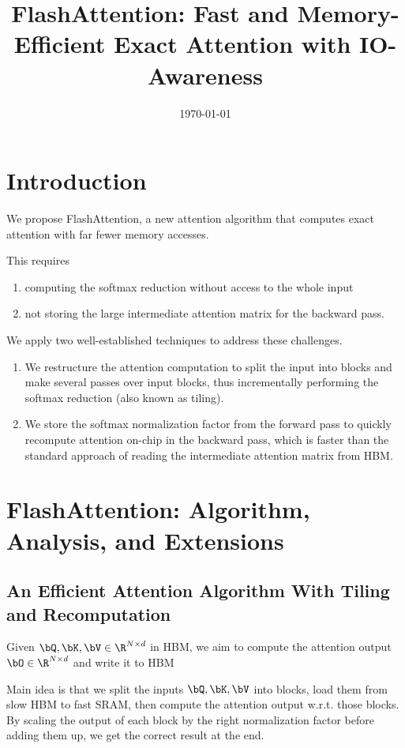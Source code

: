 \documentclass[11pt]{article}
\date{\today}
\title{FlashAttention: Fast and Memory-Efficient Exact Attention with IO-Awareness}
\begin{document}
\maketitle
\section{Introduction}
\label{sec:orgbe273ef}
We propose FlashAttention, a new attention algorithm that computes exact attention with far fewer
memory accesses.

This requires
\begin{enumerate}
\item computing the softmax reduction without access to the whole input
\item not storing the large intermediate attention matrix for the backward pass.
\end{enumerate}

We apply two well-established techniques to address these challenges.
\begin{enumerate}
\item We restructure the attention computation to split the input into blocks and make several passes
over input blocks, thus incrementally performing the softmax reduction (also known as tiling).
\item We store the softmax normalization factor from the forward pass to quickly recompute attention
on-chip in the backward pass, which is faster than the standard approach of reading the
intermediate attention matrix from HBM.
\end{enumerate}
\section{FlashAttention: Algorithm, Analysis, and Extensions}
\label{sec:orgc4ce07d}
\subsection{An Efficient Attention Algorithm With Tiling and Recomputation}
\label{sec:orgc1cf0a1}
Given \(\bQ,\bK,\bV\in\R^{N\times d}\) in HBM, we aim to compute the attention output
\(\bO\in\R^{N\times d}\) and write it to HBM

Main idea is that we split the inputs \(\bQ,\bK,\bV\) into blocks, load them from slow HBM to fast
SRAM, then compute the attention output w.r.t. those blocks. By scaling the output of each block by
the right normalization factor before adding them up, we get the correct result at the end.
\end{document}
